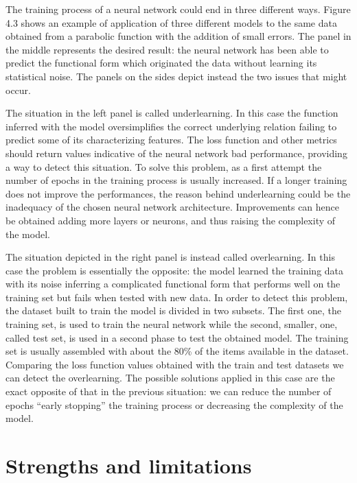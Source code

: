 \documentclass[a4paper,10pt]{report}
\begin{document}
The training process of a neural network could end in three different ways.
Figure 4.3 shows an example of application of three different models to the same data obtained 
from a parabolic function with the addition of small errors.
The panel in the middle represents the desired result: the neural network has been able to predict the 
functional form which originated the data without learning its statistical noise.
The panels on the sides depict instead the two issues that might occur.

The situation in the left panel is called underlearning. In this case the 
function inferred with the model oversimplifies the correct underlying relation failing 
to predict some of its characterizing features. The loss function and other metrics
should return values indicative of the neural network bad performance, providing
a way to detect this situation.
To solve this problem, as a first attempt the number of epochs in the training process is
usually increased. If a longer training does not improve the performances, the reason behind
underlearning could be the inadequacy of the chosen neural network architecture. 
Improvements can hence be obtained adding more layers or neurons, and thus raising the complexity of the model.

The situation depicted in the right panel is instead called overlearning.
In this case the problem is essentially the opposite: the model learned the training data
with its noise inferring a complicated functional form that performs
well on the training set but fails when tested with new data. In order to detect this problem,
the dataset built to train the model is divided in two subsets. The first one, the training set, is used to
train the neural network while the second, smaller, one, called test set, is used in a second phase to
test the obtained model. The training set is usually assembled with about the 80\% of the items available in the dataset.
Comparing the loss function values obtained with the train and test datasets we can
detect the overlearning. 
The possible solutions applied in this case are the exact opposite of that in the previous situation:
we can reduce the number of epochs ``early stopping'' the training process or decreasing the complexity of
the model.

\section{Strengths and limitations}

\end{document}
